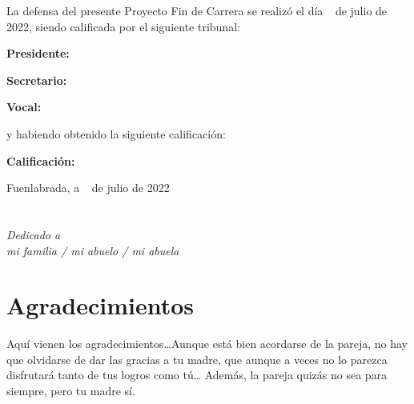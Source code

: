 \documentclass[a4paper, 12pt]{book}
\begin{document}
\vspace{1cm}
La defensa del presente Proyecto Fin de Carrera se realizó el día \qquad$\;\,$ de julio de 2022, siendo calificada por el siguiente tribunal:


\vspace{0.5cm}
\textbf{Presidente:}

\vspace{1.2cm}
\textbf{Secretario:}

\vspace{1.2cm}
\textbf{Vocal:}


\vspace{1.2cm}
y habiendo obtenido la siguiente calificación:

\vspace{1cm}
\textbf{Calificación:}


\vspace{1cm}
\begin{flushright}
Fuenlabrada, a \qquad$\;\,$ de julio de 2022
\end{flushright}


\chapter*{}
\begin{flushright}
\textit{Dedicado a \\
mi familia / mi abuelo / mi abuela}
\end{flushright}


\chapter*{Agradecimientos}

Aquí vienen los agradecimientos\ldots Aunque está bien acordarse de la pareja, no hay que olvidarse de dar las gracias a tu madre, que aunque a veces no lo parezca disfrutará tanto de tus logros como tú\ldots 
Además, la pareja quizás no sea para siempre, pero tu madre sí.

\end{document}
